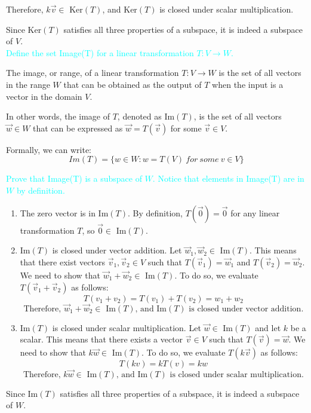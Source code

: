 \documentclass[fontsize=12pt]{scrartcl}
\begin{document}
Therefore, $k\vec{v} \in$ Ker$(T)$, and Ker$(T)$ is closed under scalar multiplication.

Since Ker$(T)$ satisfies all three properties of a subspace, it is indeed a subspace of $V$.
\\

\noindent
\textcolor{cyan}{Define the set Image(T) for a linear transformation $T: V \to W$.}

\noindent
The image, or range, of a linear transformation $T: V \rightarrow W$ is the set of all vectors in the range $W$ that can be obtained as the output of $T$ when the input is a vector in the domain $V$.

\noindent
In other words, the image of $T$, denoted as Im$(T)$, is the set of all vectors $\vec{w} \in W$ that can be expressed as $\vec{w} = T(\vec{v})$ for some $\vec{v} \in V$.

\noindent
Formally, we can write:
$$Im(T) = \{w \in W: w = T(V)\ for\ some\ v\in V \} $$

\noindent
\textcolor{cyan}{Prove that Image(T) is a subspace of $W$. Notice that elements in Image(T) are in $W$ by definition.}


\begin{enumerate}
	\item The zero vector is in Im$(T)$. By definition, $T(\vec{0}) = \vec{0}$ for any linear transformation $T$, so $\vec{0} \in$ Im$(T)$.
	\item Im$(T)$ is closed under vector addition. Let $\vec{w}_1, \vec{w}_2 \in$ Im$(T)$. This means that there exist vectors $\vec{v}_1, \vec{v}_2 \in V$ such that $T(\vec{v}_1) = \vec{w}_1$ and $T(\vec{v}_2) = \vec{w}_2$. We need to show that $\vec{w}_1 + \vec{w}_2 \in$ Im$(T)$. To do so, we evaluate $T(\vec{v}_1 + \vec{v}_2)$ as follows:
$$T(v_1+ v_2) = T(v_1) + T(v_2) = w_1 + w_2 $$
$$\text{Therefore, $\vec{w}_1 + \vec{w}_2 \in$ Im$(T)$, and Im$(T)$ is closed under vector addition.} $$
	\item Im$(T)$ is closed under scalar multiplication. Let $\vec{w} \in$ Im$(T)$ and let $k$ be a scalar. This means that there exists a vector $\vec{v} \in V$ such that $T(\vec{v}) = \vec{w}$. We need to show that $k\vec{w} \in$ Im$(T)$. To do so, we evaluate $T(k\vec{v})$ as follows:
$$T(kv) = kT(v) = kw $$
$$\text{Therefore, $k\vec{w} \in$ Im$(T)$, and Im$(T)$ is closed under scalar multiplication.} $$
\end{enumerate}
Since Im$(T)$ satisfies all three properties of a subspace, it is indeed a subspace of $W$.
\\
\end{document}
